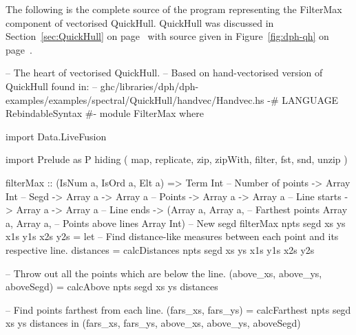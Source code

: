 \documentclass[preamble.tex]{subfiles}
\begin{document}
The following is the complete source of the program representing the FilterMax component of vectorised QuickHull. QuickHull was discussed in Section~\ref{sec:QuickHull} on page~\pageref{sec:QuickHull} with  source given in Figure~\ref{fig:dph-qh} on page~\pageref{fig:dph-qh}.


\begin{hscode}
-- The heart of vectorised QuickHull.
-- Based on hand-vectorised version of QuickHull found in:
-- ghc/libraries/dph/dph-examples/examples/spectral/QuickHull/handvec/Handvec.hs
{-# LANGUAGE RebindableSyntax #-}
module FilterMax where

import Data.LiveFusion

import Prelude as P hiding ( map, replicate, zip, zipWith,
                             filter, fst, snd, unzip )

filterMax :: (IsNum a, IsOrd a, Elt a)
          => Term Int            -- Number of points
          -> Array Int           -- Segd
          -> Array a -> Array a  -- Points
          -> Array a -> Array a  -- Line starts
          -> Array a -> Array a  -- Line ends
          -> (Array a, Array a,  -- Farthest points
              Array a, Array a,  -- Points above lines
              Array Int)         -- New segd
filterMax npts segd xs ys x1s y1s x2s y2s
  = let -- Find distance-like measures between each point and its respective line.
        distances = calcDistances npts segd xs ys x1s y1s x2s y2s

        -- Throw out all the points which are below the line.
        (above_xs, above_ys, aboveSegd) = calcAbove npts segd xs ys distances

        -- Find points farthest from each line.
        (fars_xs, fars_ys) = calcFarthest npts segd xs ys distances
    in  (fars_xs, fars_ys, above_xs, above_ys, aboveSegd)


\end{hscode}
\end{document}
